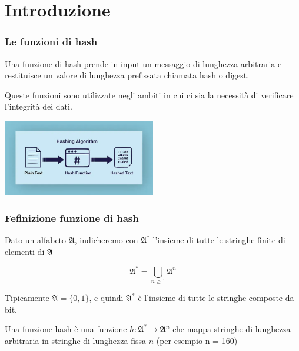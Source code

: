 
\section{Introduzione} %


\begin{frame}
\frametitle{Le funzioni di hash}

Una funzione di hash prende in input un messaggio di lunghezza arbitraria e restituisce un valore di lunghezza prefissata chiamata hash o digest.

Queste funzioni sono utilizzate negli ambiti in cui ci sia la necessità di verificare l'integrità dei dati.
\vspace{1cm}
\begin{center}
    \includegraphics[width=0.5\textwidth]{img/1-img/hash-function.jpeg}
\end{center}
    

\end{frame}

\begin{frame}
\frametitle{Fefinizione funzione di hash}

Dato un alfabeto $\mathfrak{A}$, indicheremo con $\mathfrak{A}^*$ l’insieme di tutte le stringhe finite di elementi di $\mathfrak{A}$

\[
\mathfrak{A}^* = \bigcup_{n \geq 1} \mathfrak{A}^n
\]

Tipicamente $\mathfrak{A} = \{0, 1\}$, e quindi $\mathfrak{A}^*$ è l’insieme di tutte le stringhe composte da bit.

\vspace{1cm}
Una funzione hash è una funzione $h : \mathfrak{A}^* \rightarrow \mathfrak{A}^n$ che mappa stringhe di lunghezza arbitraria in stringhe di lunghezza fissa $n$ (per esempio n = 160)

\end{frame}


